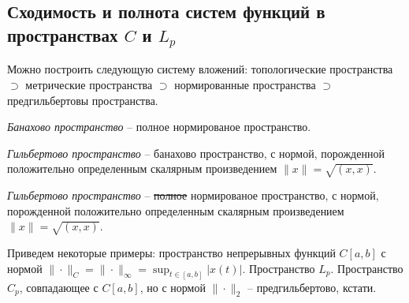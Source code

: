 \subsection{Сходимость и полнота систем функций в пространствах \texorpdfstring{$C$}{C} и \texorpdfstring{$L_p$}{Lp}}


Можно построить следующую систему вложений: топологические пространства $\supset$ метрические пространства $\supset$ нормированные пространства $\supset$ предгильбертовы пространства. 

\begin{to_def}
    \textit{Банахово пространство} -- полное нормированое пространство. 
\end{to_def}

\begin{to_def}
    \textit{Гильбертово пространство} -- банахово пространство, с нормой, порожденной положительно определенным скалярным произведением $\|x\| = \sqrt{(x, x)}$.
\end{to_def}

\begin{to_def}
    \textit{Гильбертово пространство} -- \sout{полное} нормированое пространство, с нормой, порожденной положительно определенным скалярным произведением $\|x\| = \sqrt{(x, x)}$.
\end{to_def}

Приведем некоторые примеры: пространство непрерывных функций $C[a, b]$ с нормой $\|\cdot\|_C = \|\cdot\|_{\infty} = \sup_{t \in [a, b]} |x(t)|$. Пространство $L_p$. Пространство $C_p$, совпадающее с $C[a, b]$, но с нормой $\|\cdot\|_2$ -- предгильбертово, кстати.









